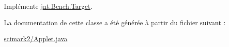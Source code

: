Implémente \hyperlink{interfacejnt_1_1Bench_1_1Target_aa848f1ea6d28c6423b3b89d10482dabe}{jnt.\-Bench.\-Target}.



La documentation de cette classe a été générée à partir du fichier suivant \-:\begin{DoxyCompactItemize}
\item 
\hyperlink{scimark2_2Applet_8java}{scimark2/\-Applet.\-java}\end{DoxyCompactItemize}
